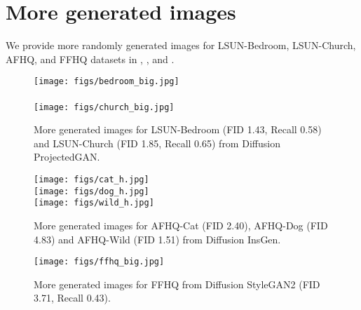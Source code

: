 \documentclass{article} \usepackage{iclr2023_conference,times}
\theoremstyle{plain}
\theoremstyle{definition}
\theoremstyle{remark}
\begin{document}
\begin{table}[!t]
    \centering
    \vspace{1mm}
    \caption{\small Inception Score for CIFAR-10.  For sampling time, we use the number of function evaluations (NFE).}
    \label{tab:inception_score}
\end{table}

\section{More generated images} \label{sec:gen_images}

We provide more randomly generated images for LSUN-Bedroom, LSUN-Church, AFHQ, and FFHQ datasets in , , and .

\begin{figure}
    \centering
    \texttt{[image: figs/bedroom\_big.jpg]} \\
    \quad \\
    \texttt{[image: figs/church\_big.jpg]}
    \caption{More generated images for LSUN-Bedroom (FID 1.43, Recall 0.58) and LSUN-Church (FID 1.85, Recall 0.65) from Diffusion ProjectedGAN. }
    \label{fig:bedroom_and_church_big}
\end{figure}

\begin{figure}
    \centering
    \texttt{[image: figs/cat\_h.jpg]} \\
    \texttt{[image: figs/dog\_h.jpg]} \\
    \texttt{[image: figs/wild\_h.jpg]}
    \caption{More generated images for AFHQ-Cat (FID 2.40), AFHQ-Dog (FID 4.83) and AFHQ-Wild (FID 1.51) from Diffusion InsGen. }
    \label{fig:afhq_big}
\end{figure}

\begin{figure}
    \centering
    \texttt{[image: figs/ffhq\_big.jpg]}
    \caption{More generated images for FFHQ from Diffusion StyleGAN2 (FID 3.71, Recall 0.43). }
    \label{fig:ffhq_big}
\end{figure}
\end{document}
